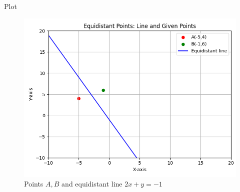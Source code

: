 \documentclass{beamer}
\begin{document}
\begin{frame}{Plot}
\begin{figure}
\centering
\includegraphics[width=0.6\columnwidth]{figs/equidistant_plot.png}
\caption{Points \(A, B\) and equidistant line \(2x + y = -1\)}
\label{fig:equidistant_plot}
\end{figure}
\end{frame}
\end{document}
